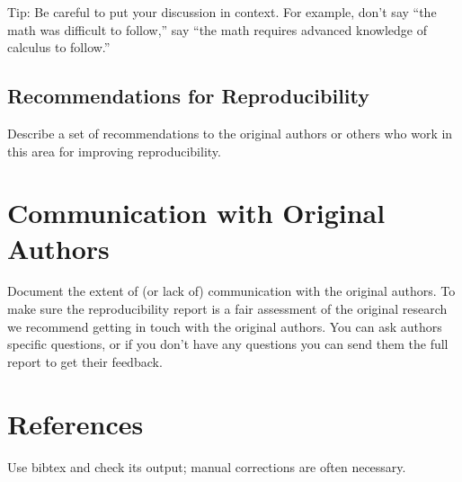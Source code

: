 \documentclass{article}
\begin{document}
Tip: Be careful to put your discussion in context. For example, don't say ``the math was difficult to follow,'' say ``the math requires advanced knowledge of calculus to follow.'' 

\subsection{Recommendations for Reproducibility}

Describe a set of recommendations to the original authors or others who work in this area for improving reproducibility.

\section*{Communication with Original Authors}
Document the extent of (or lack of) communication with the original authors. To make sure the reproducibility report is a fair assessment of the original research we recommend getting in touch with the original authors. You can ask authors specific questions, or if you don't have any questions you can send them the full report to get their feedback.


\section*{References}

Use bibtex and check its output; manual corrections are often necessary.
\end{document}
